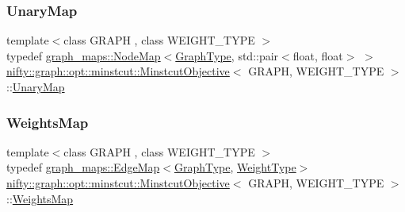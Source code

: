 \subsubsection{\texorpdfstring{Unary\+Map}{UnaryMap}}
{\footnotesize\ttfamily template$<$class G\+R\+A\+PH , class W\+E\+I\+G\+H\+T\+\_\+\+T\+Y\+PE $>$ \\
typedef \hyperlink{structnifty_1_1graph_1_1graph__maps_1_1NodeMap}{graph\+\_\+maps\+::\+Node\+Map}$<$\hyperlink{classnifty_1_1graph_1_1opt_1_1minstcut_1_1MinstcutObjective_a8d416ff18d747ac8ac242dde0e1406c0}{Graph\+Type}, std\+::pair$<$float, float$>$ $>$ \hyperlink{classnifty_1_1graph_1_1opt_1_1minstcut_1_1MinstcutObjective}{nifty\+::graph\+::opt\+::minstcut\+::\+Minstcut\+Objective}$<$ G\+R\+A\+PH, W\+E\+I\+G\+H\+T\+\_\+\+T\+Y\+PE $>$\+::\hyperlink{classnifty_1_1graph_1_1opt_1_1minstcut_1_1MinstcutObjective_a1662c8902f85cd5d0aa046c5657ee0f2}{Unary\+Map}}

\mbox{\label{classnifty_1_1graph_1_1opt_1_1minstcut_1_1MinstcutObjective_afba077d00b3dff86d2b482c1fb88344b}} 
\subsubsection{\texorpdfstring{Weights\+Map}{WeightsMap}}
{\footnotesize\ttfamily template$<$class G\+R\+A\+PH , class W\+E\+I\+G\+H\+T\+\_\+\+T\+Y\+PE $>$ \\
typedef \hyperlink{structnifty_1_1graph_1_1graph__maps_1_1EdgeMap}{graph\+\_\+maps\+::\+Edge\+Map}$<$\hyperlink{classnifty_1_1graph_1_1opt_1_1minstcut_1_1MinstcutObjective_a8d416ff18d747ac8ac242dde0e1406c0}{Graph\+Type}, \hyperlink{classnifty_1_1graph_1_1opt_1_1minstcut_1_1MinstcutObjective_a673518e95b6f21213996c12dea91d72b}{Weight\+Type}$>$ \hyperlink{classnifty_1_1graph_1_1opt_1_1minstcut_1_1MinstcutObjective}{nifty\+::graph\+::opt\+::minstcut\+::\+Minstcut\+Objective}$<$ G\+R\+A\+PH, W\+E\+I\+G\+H\+T\+\_\+\+T\+Y\+PE $>$\+::\hyperlink{classnifty_1_1graph_1_1opt_1_1minstcut_1_1MinstcutObjective_afba077d00b3dff86d2b482c1fb88344b}{Weights\+Map}}

\mbox{\label{classnifty_1_1graph_1_1opt_1_1minstcut_1_1MinstcutObjective_a673518e95b6f21213996c12dea91d72b}} 
